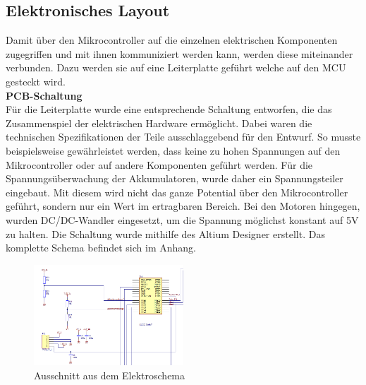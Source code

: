 \subsection{Elektronisches Layout}
Damit über den Mikrocontroller auf die einzelnen elektrischen Komponenten zugegriffen und mit ihnen kommuniziert werden kann, werden diese miteinander verbunden. Dazu werden sie auf eine Leiterplatte geführt welche auf den MCU gesteckt wird.
\\[0.2cm]
\textbf{PCB-Schaltung}\\[0.2cm]
Für die Leiterplatte wurde eine entsprechende Schaltung entworfen, die das Zusammenspiel der elektrischen Hardware ermöglicht. Dabei waren die technischen Spezifikationen der Teile ausschlaggebend für den Entwurf.
So musste beispielsweise gewährleistet werden, dass  keine zu hohen Spannungen auf den Mikrocontroller oder auf andere Komponenten geführt werden. Für die Spannungsüberwachung der Akkumulatoren, wurde daher ein Spannungsteiler eingebaut. Mit diesem wird nicht das ganze Potential über den Mikrocontroller geführt, sondern nur ein Wert im ertragbaren Bereich. Bei den Motoren hingegen, wurden DC/DC-Wandler eingesetzt, um die Spannung möglichst konstant auf 5V zu halten.
Die Schaltung wurde mithilfe des Altium Designer erstellt. Das komplette Schema befindet sich im Anhang.
\\[0.2cm]
\begin{figure}[H]
\centering
\includegraphics[width=0.5\textwidth]{03_Loesungskonzept/pictures/pcbspannungsteiler.png}
\caption{Ausschnitt aus dem Elektroschema}	
\end{figure}

